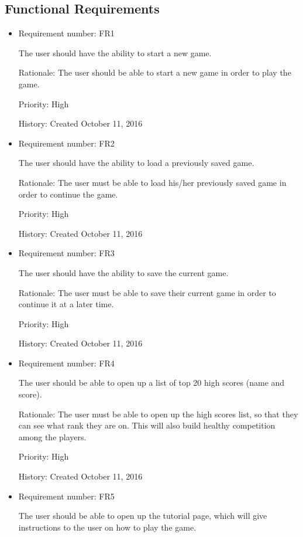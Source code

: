 \documentclass[12pt,letterpaper]{article}
\begin{document}
	\subsection{Functional Requirements}
	\begin{itemize}
		\item Requirement number: FR1  
		
		The user should have the ability to start a new game.  
		 
		Rationale: The user should be able to start a new game in order to play the game.
		
		Priority: High

		History: Created October 11, 2016

		\item Requirement number: FR2  
		
		 The user should have the ability to load a previously saved game.

		Rationale: The user must be able to load his/her previously saved game in order to continue the game.

		Priority: High

		History: Created October 11, 2016

		\item Requirement number: FR3

		The user should have the ability to save the current game.

		Rationale: The user must be able to save their current game in order to continue it at a later time.

		Priority: High

		History: Created October 11, 2016

		\item Requirement number: FR4

		The user should be able to open up a list of top 20 high scores (name and score). 

		Rationale: The user must be able to open up the high scores list, so that they can see what rank they are on. This will also build healthy competition among the players.

		Priority: High

		History: Created October 11, 2016

		\item Requirement number: FR5

		The user should be able to open up the tutorial page, which will give instructions to the user on how to play the game.


\end{itemize}
\end{document}

